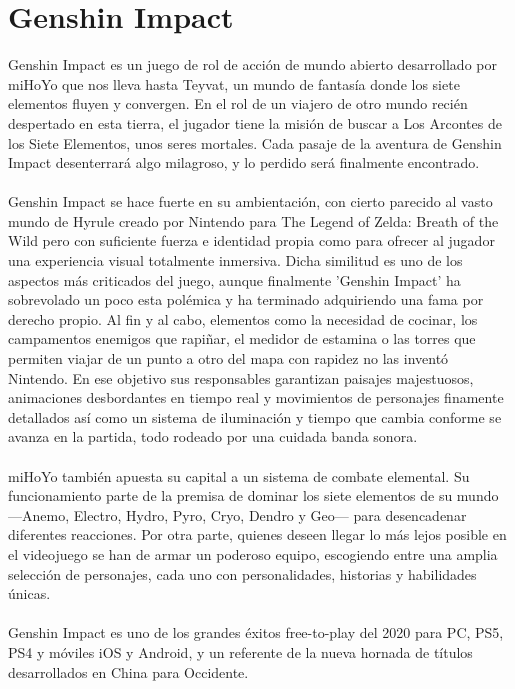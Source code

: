 \documentclass[osajnl,twocolumn,showpacs,superscriptaddress,10pt]{revtex4-2}
\begin{document}
\section{Genshin Impact}
Genshin Impact es un juego de rol de acción de mundo abierto desarrollado por miHoYo que nos lleva hasta Teyvat, un mundo de fantasía donde los siete elementos fluyen y convergen. En el rol de un viajero de otro mundo recién despertado en esta tierra, el jugador tiene la misión de buscar a Los Arcontes de los Siete Elementos, unos seres mortales. Cada pasaje de la aventura de Genshin Impact desenterrará algo milagroso, y lo perdido será finalmente encontrado.
\\\\
Genshin Impact se hace fuerte en su ambientación, con cierto parecido al vasto mundo de Hyrule creado por Nintendo para The Legend of Zelda: Breath of the Wild pero con suficiente fuerza e identidad propia como para ofrecer al jugador una experiencia visual totalmente inmersiva.\cite{3DJuegos} Dicha similitud es uno de los aspectos más criticados del juego, aunque finalmente 'Genshin Impact' ha sobrevolado un poco esta polémica y ha terminado adquiriendo una fama por derecho propio. Al fin y al cabo, elementos como la necesidad de cocinar, los campamentos enemigos que rapiñar, el medidor de estamina o las torres que permiten viajar de un punto a otro del mapa con rapidez no las inventó Nintendo\cite{xataka}. En ese objetivo sus responsables garantizan paisajes majestuosos, animaciones desbordantes en tiempo real y movimientos de personajes finamente detallados así como un sistema de iluminación y tiempo que cambia conforme se avanza en la partida, todo rodeado por una cuidada banda sonora.
\\\\
miHoYo también apuesta su capital a un sistema de combate elemental. Su funcionamiento parte de la premisa de dominar los siete elementos de su mundo—Anemo, Electro, Hydro, Pyro, Cryo, Dendro y Geo— para desencadenar diferentes reacciones. Por otra parte, quienes deseen llegar lo más lejos posible en el videojuego se han de armar un poderoso equipo, escogiendo entre una amplia selección de personajes, cada uno con personalidades, historias y habilidades únicas.
\\\\
Genshin Impact es uno de los grandes éxitos free-to-play del 2020 para PC, PS5, PS4 y móviles iOS y Android, y un referente de la nueva hornada de títulos desarrollados en China para Occidente\cite{3DJuegos}.
\end{document}
